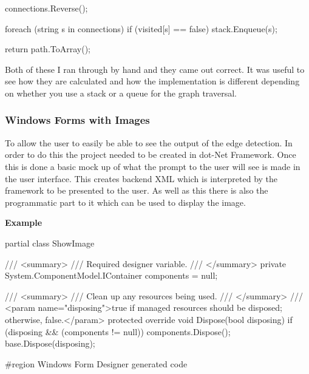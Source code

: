 \begin{flushleft}
\begin{cscode}
{{        connections.Reverse();

        foreach (string s in connections)
        {
            if (visited[s] == false)
            {
                stack.Enqueue(s);
            }
        }
    }

    return path.ToArray();
}
        \end{cscode}

        Both of these I ran through by hand and they came out correct. It was useful to see how they are calculated and how the implementation is different depending on whether you use a stack or a queue for the graph traversal.
        
        \subsubsection{Windows Forms with Images}
        To allow the user to easily be able to see the output of the edge detection. In order to do this the project needed to be created in dot-Net Framework. Once this is done a basic mock up of what the prompt to the user will see is made in the user interface. This creates backend XML which is interpreted by the framework to be presented to the user. As well as this there is also the programmatic part to it which can be used to display the image. \\ \bk
        
        \textbf{Example}

        \begin{cscode}
partial class ShowImage
{
    /// <summary>
    /// Required designer variable.
    /// </summary>
    private System.ComponentModel.IContainer components = null;

    /// <summary>
    /// Clean up any resources being used.
    /// </summary>
    /// <param name="disposing">true if managed resources should be disposed; otherwise, false.</param>
    protected override void Dispose(bool disposing)
    {
        if (disposing && (components != null))
        {
            components.Dispose();
        }
        base.Dispose(disposing);
    }

    #region Windows Form Designer generated code

}
\end{cscode}
\end{flushleft}
